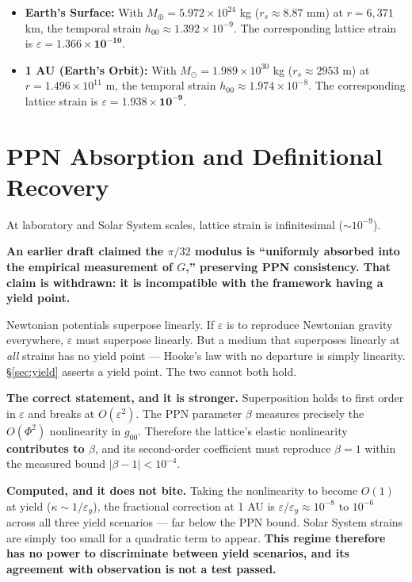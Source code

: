 \documentclass[11pt, letterpaper, openany]{book}
\begin{document}
\begin{itemize}
    \item \textbf{Earth's Surface:} With $M_{\oplus} = 5.972 \times 10^{24}$ kg ($r_s \approx 8.87$ mm) at $r = 6,371$ km, the temporal strain $h_{00} \approx 1.392 \times 10^{-9}$. The corresponding lattice strain is $\varepsilon = \mathbf{1.366 \times 10^{-10}}$.
    \item \textbf{1 AU (Earth's Orbit):} With $M_{\odot} = 1.989 \times 10^{30}$ kg ($r_s \approx 2953$ m) at $r = 1.496 \times 10^{11}$ m, the temporal strain $h_{00} \approx 1.974 \times 10^{-8}$. The corresponding lattice strain is $\varepsilon = \mathbf{1.938 \times 10^{-9}}$.
\end{itemize}

\section{PPN Absorption and Definitional Recovery}
\label{sec:ppn}

At laboratory and Solar System scales, lattice strain is infinitesimal ($\sim 10^{-9}$).

\begin{correctionbox}
\textbf{An earlier draft claimed the $\pi/32$ modulus is ``uniformly absorbed into the empirical
measurement of $G$,'' preserving PPN consistency. That claim is withdrawn: it is incompatible with
the framework having a yield point.}

\medskip
Newtonian potentials superpose linearly. If $\varepsilon$ is to reproduce Newtonian gravity
everywhere, $\varepsilon$ must superpose linearly. But a medium that superposes linearly at
\emph{all} strains has no yield point --- Hooke's law with no departure is simply linearity.
\S\ref{sec:yield} asserts a yield point. The two cannot both hold.

\medskip
\textbf{The correct statement, and it is stronger.} Superposition holds to first order in
$\varepsilon$ and breaks at $O(\varepsilon^2)$. The PPN parameter $\beta$ measures precisely the
$O(\Phi^2)$ nonlinearity in $g_{00}$. Therefore the lattice's elastic nonlinearity
\textbf{contributes to $\beta$}, and its second-order coefficient must reproduce $\beta = 1$ within
the measured bound $|\beta - 1| < 10^{-4}$.

\medskip
\textbf{Computed, and it does not bite.} Taking the nonlinearity to become $O(1)$ at yield
($\kappa \sim 1/\varepsilon_y$), the fractional correction at 1 AU is $\varepsilon/\varepsilon_y
\approx 10^{-8}$ to $10^{-6}$ across all three yield scenarios --- far below the PPN bound. Solar
System strains are simply too small for a quadratic term to appear. \textbf{This regime therefore
has no power to discriminate between yield scenarios, and its agreement with observation is not a
test passed.}
\end{correctionbox}
\end{document}
